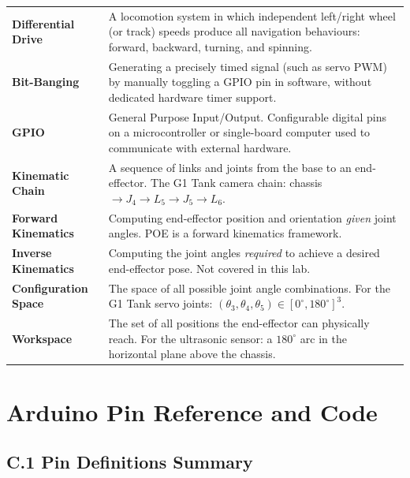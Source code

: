 \documentclass[12pt,a4paper]{article}
\begin{document}
\begin{longtable}{L{3.5cm} L{10cm}}
\textbf{Differential Drive} &
  A locomotion system in which independent left/right wheel (or track) speeds
  produce all navigation behaviours: forward, backward, turning, and spinning. \\[4pt]

\textbf{Bit-Banging} &
  Generating a precisely timed signal (such as servo PWM) by manually
  toggling a GPIO pin in software, without dedicated hardware timer support. \\[4pt]

\textbf{GPIO} &
  General Purpose Input/Output. Configurable digital pins on a microcontroller
  or single-board computer used to communicate with external hardware. \\[4pt]

\textbf{Kinematic Chain} &
  A sequence of links and joints from the base to an end-effector. The G1 Tank
  camera chain: chassis $\to J_4 \to L_5 \to J_5 \to L_6$. \\[4pt]

\textbf{Forward Kinematics} &
  Computing end-effector position and orientation \emph{given} joint angles.
  POE is a forward kinematics framework. \\[4pt]

\textbf{Inverse Kinematics} &
  Computing the joint angles \emph{required} to achieve a desired end-effector
  pose. Not covered in this lab. \\[4pt]

\textbf{Configuration Space} &
  The space of all possible joint angle combinations. For the G1 Tank servo
  joints: $(\theta_3,\theta_4,\theta_5)\in[0^\circ,180^\circ]^3$. \\[4pt]

\textbf{Workspace} &
  The set of all positions the end-effector can physically reach. For the
  ultrasonic sensor: a $180^\circ$ arc in the horizontal plane above the chassis. \\

\end{longtable}

\newpage
\section{Arduino Pin Reference and Code}

\subsection*{C.1 \quad Pin Definitions Summary}
\end{document}
